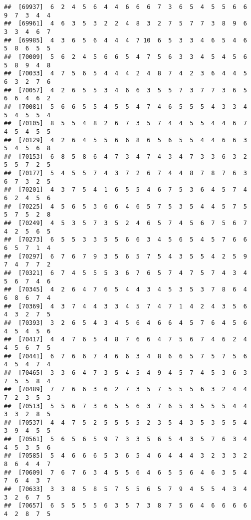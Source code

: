 \documentclass[
]{book}
\begin{document}
\begin{verbatim}
##  [69937]  6  2  4  5  6  4  4  6  6  6  7  3  6  5  4  5  5  6  6  9  7  3  4  4
##  [69961]  4  6  3  5  3  2  2  4  8  3  2  7  5  7  7  3  8  9  6  3  3  4  6  7
##  [69985]  4  3  6  5  6  4  4  4  7 10  6  5  3  3  4  6  5  4  6  5  8  6  5  5
##  [70009]  5  6  2  4  5  6  6  5  4  7  5  6  3  3  4  5  4  5  6  5  8  9  4  8
##  [70033]  4  7  5  6  5  4  4  4  2  4  8  7  4  2  3  6  4  4  5  6  3  2  7  6
##  [70057]  4  2  6  5  5  3  4  6  6  3  5  5  7  3  7  7  3  6  5  6  6  4  6  2
##  [70081]  5  6  6  5  5  4  5  5  4  7  4  6  5  5  5  4  3  3  4  5  4  5  5  4
##  [70105]  8  5  5  4  8  2  6  7  3  5  7  4  4  5  5  4  4  6  7  4  5  4  5  5
##  [70129]  4  2  6  4  5  5  6  6  8  6  5  6  5  5  4  4  6  6  3  5  4  5  6  8
##  [70153]  6  8  5  8  6  4  7  3  4  7  4  3  4  7  3  3  6  3  2  5  5  7  2  5
##  [70177]  5  4  5  5  7  4  3  7  2  6  7  4  4  8  7  8  7  6  3  6  7  3  2  5
##  [70201]  4  3  7  5  4  1  6  5  5  4  6  7  5  3  6  4  5  7  4  6  2  4  5  6
##  [70225]  4  5  6  5  3  6  6  4  6  5  7  5  3  5  4  4  5  7  5  5  7  5  2  8
##  [70249]  4  5  3  5  7  3  5  2  4  6  5  7  4  5  6  7  5  6  7  4  2  5  6  5
##  [70273]  6  5  5  3  3  5  5  6  6  3  4  5  6  5  4  5  7  6  6  6  5  7  1  4
##  [70297]  6  7  6  7  9  3  5  6  5  7  5  4  3  5  5  4  2  5  9  7  4  7  7  2
##  [70321]  6  7  4  5  5  5  3  6  7  6  5  7  4  7  5  7  4  3  4  5  6  7  4  6
##  [70345]  4  2  6  4  7  6  5  4  4  3  4  5  3  5  3  7  8  6  4  6  8  6  7  4
##  [70369]  4  3  7  4  4  3  3  4  5  7  4  7  1  4  2  4  3  5  6  4  3  2  7  5
##  [70393]  3  2  6  5  4  3  4  5  6  4  6  6  4  5  7  6  4  5  6  4  5  4  5  6
##  [70417]  4  4  7  6  5  4  8  7  6  6  4  7  5  6  7  4  6  2  4  4  5  6  7  5
##  [70441]  6  7  6  6  7  4  6  6  3  4  8  6  6  5  7  5  7  5  6  4  5  4  7  4
##  [70465]  3  3  6  4  7  3  5  4  5  4  9  4  5  7  4  5  3  6  3  7  5  5  8  4
##  [70489]  7  7  6  6  3  6  2  7  3  5  7  5  5  5  6  3  2  4  4  7  2  3  5  3
##  [70513]  5  5  6  7  3  6  5  5  6  3  7  6  5  3  5  5  5  4  4  3  3  2  8  5
##  [70537]  4  4  7  5  2  5  5  5  5  2  3  5  4  3  5  3  5  5  4  3  9  4  5  5
##  [70561]  5  6  5  6  5  9  7  3  3  5  6  5  4  3  5  7  6  3  4  4  5  3  5  6
##  [70585]  5  4  6  6  6  5  3  6  5  4  6  4  4  4  3  2  3  3  2  8  6  4  4  7
##  [70609]  7  6  7  6  3  4  5  5  6  4  6  5  5  6  4  6  3  5  4  7  6  4  3  7
##  [70633]  3  3  8  5  8  5  7  5  5  6  5  7  9  4  5  5  4  3  4  3  2  6  7  5
##  [70657]  6  5  5  5  5  6  3  5  7  3  8  7  5  6  4  6  6  6  6  4  2  8  7  5

\end{verbatim}
\end{document}
